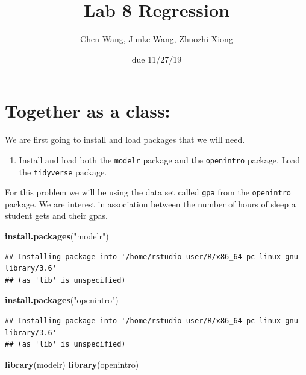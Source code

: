 \documentclass[]{article}
\title{Lab 8 Regression}
\author{Chen Wang, Junke Wang, Zhuozhi Xiong}
\date{due 11/27/19}
\newenvironment{Shaded}{\begin{snugshade}}{\end{snugshade}}
\newcommand{\KeywordTok}[1]{\textcolor[rgb]{0.13,0.29,0.53}{\textbf{#1}}}
\newcommand{\NormalTok}[1]{#1}
\newcommand{\StringTok}[1]{\textcolor[rgb]{0.31,0.60,0.02}{#1}}
\providecommand{\tightlist}{%
  \setlength{\itemsep}{0pt}\setlength{\parskip}{0pt}}
\begin{document}
\maketitle

\hypertarget{together-as-a-class}{%
\section{Together as a class:}\label{together-as-a-class}}

We are first going to install and load packages that we will need.

\begin{enumerate}
\def\labelenumi{\arabic{enumi}.}
\tightlist
\item
  Install and load both the \texttt{modelr} package and the
  \texttt{openintro} package. Load the \texttt{tidyverse} package.
\end{enumerate}

For this problem we will be using the data set called \texttt{gpa} from
the \texttt{openintro} package. We are interest in association between
the number of hours of sleep a student gets and their gpas.

\begin{Shaded}
\begin{Highlighting}[]
\KeywordTok{install.packages}\NormalTok{(}\StringTok{"modelr"}\NormalTok{)}
\end{Highlighting}
\end{Shaded}

\begin{verbatim}
## Installing package into '/home/rstudio-user/R/x86_64-pc-linux-gnu-library/3.6'
## (as 'lib' is unspecified)
\end{verbatim}

\begin{Shaded}
\begin{Highlighting}[]
\KeywordTok{install.packages}\NormalTok{(}\StringTok{"openintro"}\NormalTok{)}
\end{Highlighting}
\end{Shaded}

\begin{verbatim}
## Installing package into '/home/rstudio-user/R/x86_64-pc-linux-gnu-library/3.6'
## (as 'lib' is unspecified)
\end{verbatim}

\begin{Shaded}
\begin{Highlighting}[]
\KeywordTok{library}\NormalTok{(modelr)}
\KeywordTok{library}\NormalTok{(openintro)}
\end{Highlighting}
\end{Shaded}
\end{document}
